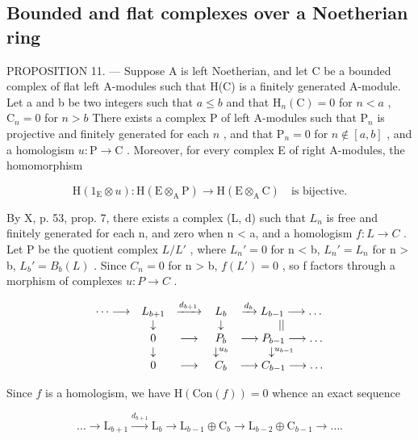 \subsection{Bounded and flat complexes over a Noetherian ring}

PROPOSITION 11. --- Suppose A is left Noetherian, and let C be a bounded complex of flat left A-modules such that H(C) is a finitely generated A-module. Let a and b be two integers such that \(a \leqslant b\) and that \(\mathrm{H}_{n}(\mathrm{C}) = 0\) for \(n < a\) , \(\mathrm{C}_{n} = 0\) for \(n > b\) There exists a complex P of left A-modules such that \(\mathrm{P}_{n}\) is projective and finitely generated for each \(n\) , and that \(\mathrm{P}_{n} = 0\) for \(n \notin [a, b]\) , and a homologism \(u: \mathrm{P} \to \mathrm{C}\) . Moreover, for every complex E of right A-modules, the homomorphism

\[
\mathrm{H} \left(1 _ {\mathrm{E}} \otimes u\right): \mathrm{H} (\mathrm{E} \otimes_ {\mathrm{A}} \mathrm{P}) \rightarrow \mathrm{H} (\mathrm{E} \otimes_ {\mathrm{A}} \mathrm{C}) \quad \text{is bijective.}
\]

By X, p. 53, prop. 7, there exists a complex (L, d) such that \(L_{n}\) is free and finitely generated for each n, and zero when n \textless{} a, and a homologism \(f: L \to C\) . Let P be the quotient complex \(L/L'\) , where \(L_{n}' = 0\) for n \textless{} b, \(L_{n}' = L_{n}\) for n \textgreater{} b, \(L_{b}' = B_{b}(L)\) . Since \(C_{n} = 0\) for n \textgreater{} b, \(f(L') = 0\) , so f factors through a morphism of complexes \(u: P \to C\) .

\[
\begin{array}{c c c c c} \dots \longrightarrow & L _ {b + 1} & \xrightarrow {d _ {b + 1}} & L _ {b} & \xrightarrow {d _ {b}} L _ {b - 1} \longrightarrow \dots \\ & \downarrow & & \downarrow & | | \\ & 0 & \longrightarrow & P _ {b} & \longrightarrow P _ {b - 1} \longrightarrow \dots \\ & \downarrow & & \downarrow^ {u _ {b}} & \downarrow^ {u _ {b - 1}} \\ & 0 & \longrightarrow & C _ {b} & \longrightarrow C _ {b - 1} \longrightarrow \dots \end{array}
\]

Since \(f\) is a homologism, we have \(\mathrm{H}(\mathrm{Con}(f)) = 0\) whence an exact sequence

\[
\dots \rightarrow \mathrm{L} _ {b + 1} \xrightarrow {d _ {b + 1}} \mathrm{L} _ {b} \longrightarrow \mathrm{L} _ {b - 1} \oplus \mathrm{C} _ {b} \longrightarrow \mathrm{L} _ {b - 2} \oplus \mathrm{C} _ {b - 1} \rightarrow \dots .
\]

